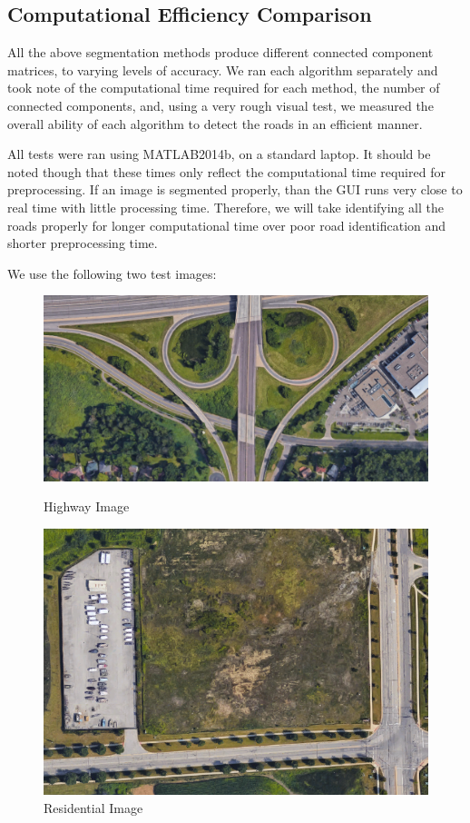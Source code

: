 \documentclass[12pt]{article}
\begin{document}
\subsection*{Computational Efficiency Comparison}

All the above segmentation methods produce different connected component matrices, to varying levels of accuracy. We ran each algorithm separately and took note of the computational time required for each method, the number of connected components, and, using a very rough visual test, we measured the overall ability of each algorithm to detect the roads in an efficient manner. 

All tests were ran using MATLAB2014b, on a standard laptop. It should be noted though that these times only reflect the computational time required for preprocessing. If an image is segmented properly, than the GUI runs very close to real time with little processing time. Therefore, we will take identifying all the roads properly for longer computational time over poor road identification and shorter preprocessing time. 


We use the following two test images: 
\begin{figure}[h!]
  \centering
  \begin{minipage}[b]{0.4\textwidth}
    \includegraphics[width=\textwidth]{1004.png}
    \caption{Highway Image}
  \end{minipage}
  \hfill
  \begin{minipage}[b]{0.4\textwidth}
    \includegraphics[width=\textwidth]{roadnearlot.png}
    \caption{Residential Image}
  \end{minipage}
\end{figure}
\end{document}
